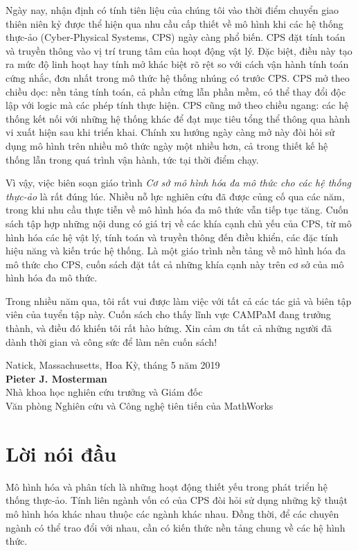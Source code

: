Ngày nay, nhận định có tính tiên liệu của chúng tôi vào thời điểm chuyển giao thiên niên kỷ được thể hiện qua nhu cầu cấp thiết về mô hình khi các hệ thống thực-ảo (Cyber-Physical Systems, CPS) ngày càng phổ biến. CPS đặt tính toán và truyền thông vào vị trí trung tâm của hoạt động vật lý. Đặc biệt, điều này tạo ra mức độ linh hoạt hay tính mở khác biệt rõ rệt so với cách vận hành tính toán cứng nhắc, đơn nhất trong mô thức hệ thống nhúng có trước CPS. CPS mở theo chiều dọc: nền tảng tính toán, cả phần cứng lẫn phần mềm, có thể thay đổi độc lập với logic mà các phép tính thực hiện. CPS cũng mở theo chiều ngang: các hệ thống kết nối với những hệ thống khác để đạt mục tiêu tổng thể thông qua hành vi xuất hiện sau khi triển khai. Chính xu hướng ngày càng mở này đòi hỏi sử dụng mô hình trên nhiều mô thức ngày một nhiều hơn, cả trong thiết kế hệ thống lẫn trong quá trình vận hành, tức tại thời điểm chạy.

Vì vậy, việc biên soạn giáo trình \emph{Cơ sở mô hình hóa đa mô thức cho các hệ thống thực-ảo} là rất đúng lúc. Nhiều nỗ lực nghiên cứu đã được củng cố qua các năm, trong khi nhu cầu thực tiễn về mô hình hóa đa mô thức vẫn tiếp tục tăng. Cuốn sách tập hợp những nội dung có giá trị về các khía cạnh chủ yếu của CPS, từ mô hình hóa các hệ vật lý, tính toán và truyền thông đến điều khiển, các đặc tính hiệu năng và kiến trúc hệ thống. Là một giáo trình nền tảng về mô hình hóa đa mô thức cho CPS, cuốn sách đặt tất cả những khía cạnh này trên cơ sở của mô hình hóa đa mô thức.

Trong nhiều năm qua, tôi rất vui được làm việc với tất cả các tác giả và biên tập viên của tuyển tập này. Cuốn sách cho thấy lĩnh vực CAMPaM đang trưởng thành, và điều đó khiến tôi rất hào hứng. Xin cảm ơn tất cả những người đã dành thời gian và công sức để làm nên cuốn sách!

\begin{flushright}
Natick, Massachusetts, Hoa Kỳ, tháng 5 năm 2019\\
\textbf{Pieter J. Mosterman}\\
Nhà khoa học nghiên cứu trưởng và Giám đốc\\
Văn phòng Nghiên cứu và Công nghệ tiên tiến của MathWorks
\end{flushright}

\chapter*{Lời nói đầu}
Mô hình hóa và phân tích là những hoạt động thiết yếu trong phát triển hệ thống thực-ảo. Tính liên ngành vốn có của CPS đòi hỏi sử dụng những kỹ thuật mô hình hóa khác nhau thuộc các ngành khác nhau. Đồng thời, để các chuyên ngành có thể trao đổi với nhau, cần có kiến thức nền tảng chung về các hệ hình thức.

